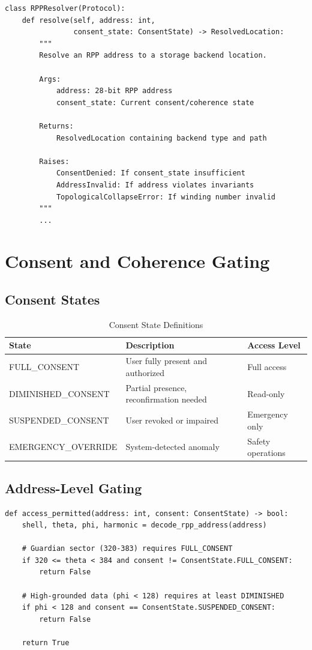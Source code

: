 \documentclass[11pt,a4paper]{article}
\begin{document}
\begin{lstlisting}[style=python,caption={RPP Resolver Interface}]
class RPPResolver(Protocol):
    def resolve(self, address: int,
                consent_state: ConsentState) -> ResolvedLocation:
        """
        Resolve an RPP address to a storage backend location.

        Args:
            address: 28-bit RPP address
            consent_state: Current consent/coherence state

        Returns:
            ResolvedLocation containing backend type and path

        Raises:
            ConsentDenied: If consent_state insufficient
            AddressInvalid: If address violates invariants
            TopologicalCollapseError: If winding number invalid
        """
        ...
\end{lstlisting}

\section{Consent and Coherence Gating}

\subsection{Consent States}

\begin{table}[h]
\centering
\begin{tabular}{lll}
\toprule
\textbf{State} & \textbf{Description} & \textbf{Access Level} \\
\midrule
FULL\_CONSENT & User fully present and authorized & Full access \\
DIMINISHED\_CONSENT & Partial presence, reconfirmation needed & Read-only \\
SUSPENDED\_CONSENT & User revoked or impaired & Emergency only \\
EMERGENCY\_OVERRIDE & System-detected anomaly & Safety operations \\
\bottomrule
\end{tabular}
\caption{Consent State Definitions}
\end{table}

\subsection{Address-Level Gating}

\begin{lstlisting}[style=python,caption={Consent-Aware Access Control}]
def access_permitted(address: int, consent: ConsentState) -> bool:
    shell, theta, phi, harmonic = decode_rpp_address(address)

    # Guardian sector (320-383) requires FULL_CONSENT
    if 320 <= theta < 384 and consent != ConsentState.FULL_CONSENT:
        return False

    # High-grounded data (phi < 128) requires at least DIMINISHED
    if phi < 128 and consent == ConsentState.SUSPENDED_CONSENT:
        return False

    return True
\end{lstlisting}
\end{document}
